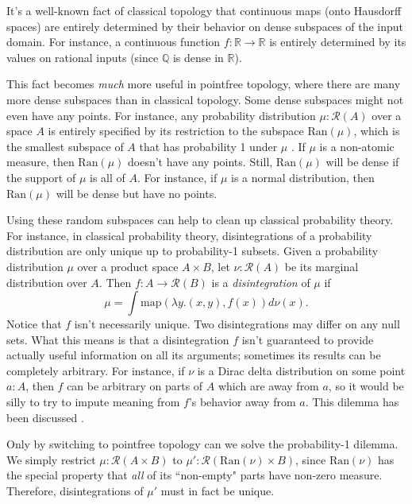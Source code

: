 It's a well-known fact of classical topology that continuous maps (onto
Hausdorff spaces) are entirely determined by their behavior on 
dense subspaces of the input domain. For instance, a continuous function 
$f : \mathbb{R} \to \mathbb{R}$ is entirely determined by its values 
on rational inputs (since $\mathbb{Q}$ is dense in $\mathbb{R}$).

This fact becomes \emph{much} more useful in pointfree topology, where there are
many more dense subspaces than in classical topology. Some dense subspaces 
might not even have any points. For instance, any probability distribution
$\mu : \mathcal{R}(A)$ over a space $A$ is entirely specified by its
restriction to the subspace $\text{Ran}(\mu)$, which is the smallest subspace
of $A$ that has probability 1 under $\mu$ \cite{simpson2012}.
If $\mu$ is a non-atomic measure,
then $\text{Ran}(\mu)$ doesn't have any points. Still, $\text{Ran}(\mu)$ will
be dense if the support of $\mu$ is all of $A$. For instance, if $\mu$ is
a normal distribution, then $\text{Ran}(\mu)$ will be dense but have no points.

Using these random subspaces can help to clean up classical probability theory.
For instance, in classical probability theory, disintegrations of a probability
distribution are only unique up to probability-1 subsets. Given a probability
distribution $\mu$ over a product space $A \times B$, let 
$\nu : \mathcal{R}(A)$ be its marginal distribution over $A$. Then 
$f : A \to \mathcal{R}(B)$ is a \emph{disintegration} of $\mu$ if
$$ \mu = \int \text{map}(\lambda y. (x, y), f(x)) d\nu(x). $$
Notice that $f$ isn't necessarily unique. Two disintegrations may differ on
any null sets. What this means is that a disintegration $f$ isn't 
guaranteed to provide actually useful information on all its arguments;
sometimes its results can be completely arbitrary. For instance, if $\nu$ is a
Dirac delta distribution on some point $a : A$, then $f$ can be arbitrary
on parts of $A$ which are away from $a$, so it would be silly to try to impute
meaning from $f$'s behavior away from $a$. This dilemma has been discussed
\cite{shan2016}.

Only by switching to pointfree topology can we solve the probability-1 dilemma.
We simply restrict $\mu : \mathcal{R}(A \times B)$ to 
$\mu' : \mathcal{R}(\text{Ran}(\nu) \times B)$, since $\text{Ran}(\nu)$ has
the special property that \emph{all} of its ``non-empty" parts have non-zero measure.
Therefore, disintegrations of $\mu'$ must in fact be unique.

